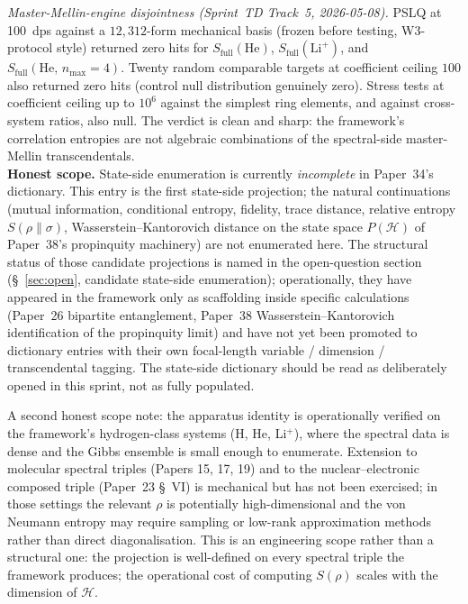 \textit{Master-Mellin-engine disjointness (Sprint~TD Track~5,
2026-05-08).}  PSLQ at 100~dps against a $12{,}312$-form mechanical
basis (frozen before testing, W3-protocol style) returned zero hits
for $S_\mathrm{full}(\mathrm{He})$, $S_\mathrm{full}(\mathrm{Li}^+)$,
and $S_\mathrm{full}(\mathrm{He},\, n_{\max}{=}4)$.  Twenty random
comparable targets at coefficient ceiling $100$ also returned zero
hits (control null distribution genuinely zero).  Stress tests at
coefficient ceiling up to $10^6$ against the simplest ring elements,
and against cross-system ratios, also null.  The verdict is clean and
sharp: the framework's correlation entropies are not algebraic
combinations of the spectral-side master-Mellin transcendentals.\\
\textbf{Honest scope.}  State-side enumeration is currently
\emph{incomplete} in Paper~34's dictionary.  This entry is the first
state-side projection; the natural continuations
(mutual information, conditional entropy, fidelity, trace distance,
relative entropy $S(\rho \| \sigma)$, Wasserstein--Kantorovich
distance on the state space $P(\mathcal{H})$ of Paper~38's propinquity
machinery) are not enumerated here.  The structural status of those
candidate projections is named in the open-question section
(\S~\ref{sec:open}, candidate state-side enumeration); operationally,
they have appeared in the framework only as scaffolding inside
specific calculations (Paper~26 bipartite entanglement, Paper~38
Wasserstein--Kantorovich identification of the propinquity limit) and
have not yet been promoted to dictionary entries with their own
focal-length variable / dimension / transcendental tagging.  The
state-side dictionary should be read as deliberately opened in this
sprint, not as fully populated.

A second honest scope note: the apparatus identity is operationally
verified on the framework's hydrogen-class systems
(H, He, Li$^+$), where the spectral data is dense and the Gibbs
ensemble is small enough to enumerate.  Extension to molecular
spectral triples (Papers 15, 17, 19) and to the nuclear--electronic
composed triple (Paper~23 \S~VI) is mechanical but has not been
exercised; in those settings the relevant $\rho$ is potentially
high-dimensional and the von Neumann entropy may require sampling
or low-rank approximation methods rather than direct
diagonalisation.  This is an engineering scope rather than a
structural one: the projection is well-defined on every spectral
triple the framework produces; the operational cost of computing
$S(\rho)$ scales with the dimension of $\mathcal{H}$.

